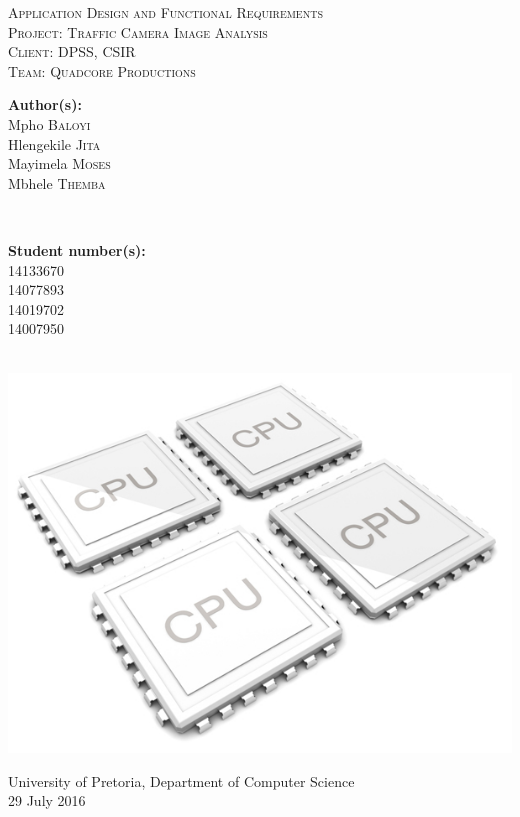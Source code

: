\documentclass[a4paper,12pt]{article}
\begin{document}
\begin{titlepage}
\center

\textsc{\LARGE Application Design and Functional Requirements}\\[1.5cm]
\textsc{\Large Project: Traffic Camera Image Analysis}\\[1.5cm]
\textsc{\large Client: DPSS, CSIR}\\[0.5cm]
\textsc{\large Team: Quadcore Productions}\\[0.5cm]

\begin{minipage}{0.4\textwidth}
\begin{flushleft} \large
\textbf{Author(s):}\\
Mpho \textsc{Baloyi}\\
Hlengekile \textsc{Jita}\\
Mayimela \textsc{Moses}\\
Mbhele \textsc{Themba}\\
\end{flushleft}
\end{minipage}
~
\begin{minipage}{0.4\textwidth}
\begin{flushright} \large
\textbf{Student number(s):} \\
14133670\\ %
14077893\\
14019702\\
14007950\\
\end{flushright}
\end{minipage}\\

\includegraphics[width=\textwidth]{2012-quad-core-phones.jpg}

{\large University of Pretoria, Department of Computer Science}\\

{\large 29 July 2016}\\[3cm]

\vfil

\end{titlepage}
\end{document}
